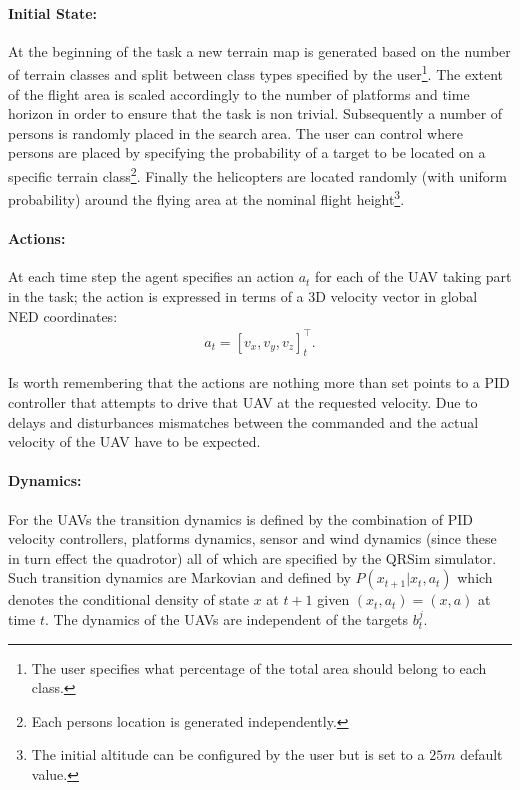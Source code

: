 \documentclass[a4paper,11pt]{report}
\newcommand{\sname}{QRSim\xspace}
\begin{document}
\paragraph{Initial State:} At the beginning of the task a new terrain map is generated based on the number of terrain classes and split between class types specified by the user\footnote{The user specifies what percentage of the total area should belong to each class.}. 
The extent of the flight area is scaled accordingly to the number of platforms and time horizon in order to ensure that the task is non trivial.
Subsequently a number of persons is randomly placed in the search area. The user can control where persons are placed by specifying the probability of a target to be located on a specific terrain class\footnote{Each persons location is generated independently.}. 
Finally the helicopters are located randomly (with uniform probability) around the flying area at the nominal flight height\footnote{The initial altitude can be configured by the user but is set to a $25m$ default value.}.

\paragraph{Actions:}
At each time step the agent specifies an action $a_t$ for each of the UAV taking part in the task; the action is expressed in terms of a 3D velocity vector in global NED coordinates:
\begin{align}
a_t=[v_x,v_y,v_z]_t^\intercal.
\end{align}

Is worth remembering that the actions are nothing more than set points to a PID controller that attempts to drive that UAV at the requested velocity.
Due to delays and disturbances mismatches between the commanded and the actual velocity of the UAV have to be expected. 

\paragraph{Dynamics:}\label{rescued} For the UAVs the transition dynamics is defined by the combination of PID velocity controllers, platforms dynamics, sensor and wind dynamics (since these in turn effect the quadrotor) all of which are specified by the \sname simulator. Such transition dynamics are Markovian and defined by $P(x_{t+1}|x_t,a_t)$ which denotes the conditional density of state $x$ at $t+1$ given $(x_t,a_t) = (x,a)$ at time $t$.
The dynamics of the UAVs are independent of the targets $b^j_t$.
\end{document}

